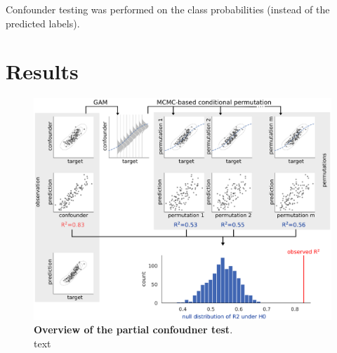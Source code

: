 \documentclass{article}
\begin{document}
Confounder testing was performed on the class probabilities (instead of the predicted labels).

\section{Results}


\begin{figure}[!b]
  \centering
  \includegraphics[width=0.5\paperwidth]{fig/overview.eps}
  \caption{\textbf{Overview of the partial confoudner test}. \\
    text
  }
  \label{fig:overview}
\end{figure}
\end{document}
